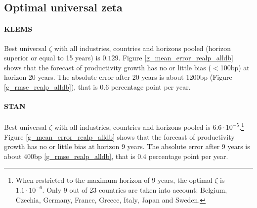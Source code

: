 \subsection{Optimal universal zeta}
\label{sect_zeta_minimal_bias}

\paragraph{KLEMS}


Best universal $\zeta$ with all industries, countries and horizons pooled (horizon superior or equal to 15 years) is $0.129$.
Figure \ref{g_mean_error_realp_alldb} shows that the forecast of productivity growth has no or little bias ($<$100bp) at horizon 20 years. 
The absolute error after 20 years is about 1200bp (Figure \ref{g_rmse_realp_alldb}), that is 0.6 percentage point per year. 





\paragraph{STAN}


Best universal $\zeta$ with all industries, countries and horizons pooled is $6.6\cdot 10^{-5}$.\footnote{When restricted to the maximum horizon of 9 years, the optimal $\zeta$ is $1.1\cdot 10^{-6}$. Only 9 out of 23 countries are taken into account: Belgium, Czechia, Germany, France, Greece, Italy, Japan and Sweden.} 
Figure \ref{g_mean_error_realp_alldb} shows that the forecast of productivity growth has no or little bias at horizon 9 years. 
 The absolute error after 9 years is about 400bp \ref{g_rmse_realp_alldb}, that is 0.4 percentage point per year. 



